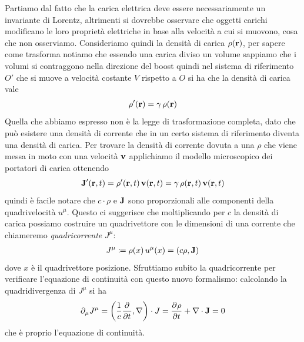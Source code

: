 Partiamo dal fatto che la carica elettrica deve essere necessariamente un invariante di Lorentz, altrimenti si dovrebbe osservare che oggetti carichi 
modificano le loro proprietà elettriche in base alla velocità a cui si muovono, cosa che non osserviamo. Consideriamo quindi la densità di carica 
$ \rho(\mathbf{r}) $, per sapere come trasforma notiamo che essendo una carica diviso un volume sappiamo che i volumi si contraggono nella direzione del boost 
quindi nel sistema di riferimento $ O' $ che si muove a velocità costante $ V $ rispetto a $ O $ si ha che la densità di carica vale
\begin{align}
  \rho'(\mathbf{r}) = \gamma \, \rho(\mathbf{r})
\end{align}
Quella che abbiamo espresso non è la legge di trasformazione completa, dato che può esistere una densità di corrente che in un certo sistema di riferimento 
diventa una densità di carica. Per trovare la densità di corrente dovuta a una $ \rho $ che viene messa in moto con una velocità $ \mathbf{v} $ applichiamo il 
modello microscopico dei portatori di carica ottenendo
\begin{align}
  \mathbf{J'}(\mathbf{r}, t) = \rho'(\mathbf{r}, t) \, \mathbf{v}(\mathbf{r},t) = \gamma \, \rho(\mathbf{r}, t) \, \mathbf{v}(\mathbf{r},t)
\end{align}
quindi è facile notare che $ c\cdot \rho $ e $ \mathbf{J} $ sono proporzionali alle componenti della quadrivelocità $ u^\mu $. Questo ci suggerisce che moltiplicando 
per $ c $ la densità di carica possiamo costruire un quadrivettore con le dimensioni di una corrente che chiameremo \textit{quadricorrente} $ J^\mu $:
\begin{align}
  J^\mu \coloneq \rho(x) \, u^\mu (x) = \left( c \rho , \mathbf{J}\right)
\end{align}
dove $ x $ è il quadrivettore posizione. Sfruttiamo subito la quadricorrente per verificare l'equazione di continuità con questo nuovo formalismo: 
calcolando la quadridivergenza di $ J^\mu $ si ha
\begin{align}
  \partial_\mu J^\mu  = \left( \frac{1}{c} \frac{\partial^{} {}}{\partial {t}^{}}, \nabla \right) \cdot J = \frac{\partial^{} {\rho}}{\partial {t}^{}} + \nabla \cdot \mathbf{J} = 0
\end{align}
che è proprio l'equazione di continuità.

